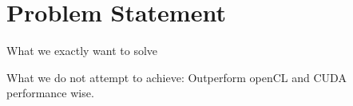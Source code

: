 \section{Problem Statement}
What we exactly want to solve

What we do not attempt to achieve:
Outperform openCL and CUDA performance wise. 